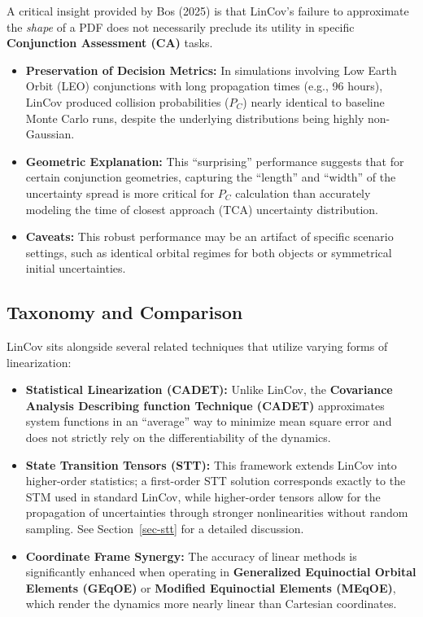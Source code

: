 \documentclass[
  letterpaper,
  DIV=11,
  numbers=noendperiod,
  oneside]{scrartcl}
\begin{document}
A critical insight provided by Bos (2025) is that LinCov's failure to
approximate the \emph{shape} of a PDF does not necessarily preclude its
utility in specific \textbf{Conjunction Assessment (CA)} tasks.

\begin{itemize}
\item
  \textbf{Preservation of Decision Metrics:} In simulations involving
  Low Earth Orbit (LEO) conjunctions with long propagation times (e.g.,
  96 hours), LinCov produced collision probabilities (\(P_C\)) nearly
  identical to baseline Monte Carlo runs, despite the underlying
  distributions being highly non-Gaussian.
\item
  \textbf{Geometric Explanation:} This ``surprising'' performance
  suggests that for certain conjunction geometries, capturing the
  ``length'' and ``width'' of the uncertainty spread is more critical
  for \(P_C\) calculation than accurately modeling the time of closest
  approach (TCA) uncertainty distribution.
\item
  \textbf{Caveats:} This robust performance may be an artifact of
  specific scenario settings, such as identical orbital regimes for both
  objects or symmetrical initial uncertainties.
\end{itemize}

\subsection{Taxonomy and Comparison}\label{taxonomy-and-comparison}

LinCov sits alongside several related techniques that utilize varying
forms of linearization:

\begin{itemize}
\item
  \textbf{Statistical Linearization (CADET):} Unlike LinCov, the
  \textbf{Covariance Analysis Describing function Technique (CADET)}
  approximates system functions in an ``average'' way to minimize mean
  square error and does not strictly rely on the differentiability of
  the dynamics.
\item
  \textbf{State Transition Tensors (STT):} This framework extends LinCov
  into higher-order statistics; a first-order STT solution corresponds
  exactly to the STM used in standard LinCov, while higher-order tensors
  allow for the propagation of uncertainties through stronger
  nonlinearities without random sampling. See Section~\ref{sec-stt} for
  a detailed discussion.
\item
  \textbf{Coordinate Frame Synergy:} The accuracy of linear methods is
  significantly enhanced when operating in \textbf{Generalized
  Equinoctial Orbital Elements (GEqOE)} or \textbf{Modified Equinoctial
  Elements (MEqOE)}, which render the dynamics more nearly linear than
  Cartesian coordinates.
\end{itemize}
\end{document}
